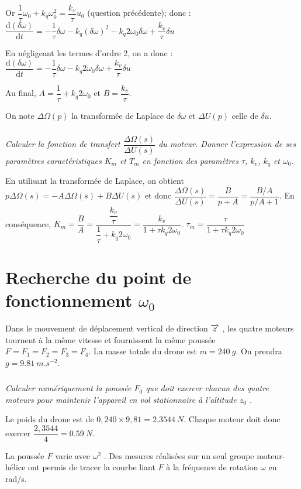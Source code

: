 \begin{multicols}{2}
\begin{corrige}
Or $\dfrac{1}{\tau}\omega_0 +k_q\omega_0^2 = \dfrac{k_v}{\tau}u_0$ (question précédente); donc :
$
\dfrac{\text{d}\left(\delta \omega \right)}{\text{d}t}= -\dfrac{1}{\tau}\delta \omega-k_q\left(\delta\omega\right)^2 -k_q2 \omega_0 \delta\omega + \dfrac{k_v}{\tau} \delta u
$

En négligeant les termes d'ordre 2, on a donc : 
$
\dfrac{\text{d}\left(\delta \omega \right)}{\text{d}t}= -\dfrac{1}{\tau}\delta \omega -k_q2 \omega_0 \delta\omega + \dfrac{k_v}{\tau} \delta u
$

Au final, $A=\dfrac{1}{\tau}+k_q2 \omega_0$ et $B=\dfrac{k_v}{\tau}$.
\end{corrige}
\else
\fi
On note $\Delta \Omega (p)$ la transformée de Laplace de $\delta \omega$ et $\Delta U(p)$ celle de $\delta u$.


\subparagraph{}\textit{Calculer la fonction de transfert $\dfrac{\Delta{\Omega(s)}}{\Delta U(s)}$ du moteur. Donner l'expression de ses paramètres caractéristiques $K_m$ et $T_m$ en fonction des paramètres $\tau$, $k_v$, $k_q$ et $\omega_0$.}
\ifprof
\begin{corrige}
En utilisant la transformée de Laplace, on obtient $p\Delta\Omega(s) = -A\Delta\Omega(s) + B \Delta U(s)$ et donc 
 $\dfrac{\Delta{\Omega(s)}}{\Delta U(s)}= \dfrac{B}{p+A} = \dfrac{B/A}{p/A+1}  $. 
 En conséquence, $K_m = \dfrac{B}{A} = \dfrac{\dfrac{k_v}{\tau}}{\dfrac{1}{\tau}+k_q2 \omega_0}= \dfrac{k_v}{1+\tau k_q2 \omega_0}$. 
 $\tau_m = \dfrac{\tau}{1+\tau k_q2 \omega_0} $ 
\end{corrige}
\else
\fi
\section*{Recherche du point de fonctionnement $\omega_0$}
Dans le mouvement de déplacement vertical de direction $\overrightarrow{z}$ , les quatre moteurs tournent à la même vitesse et fournissent la même poussée $F=F_1=F_2=F_3=F_4$.
La masse totale du drone est $m=\SI{240}{g}$. On prendra $g=\SI{9,81}{m.s^{-2}}$.

\subparagraph{}\textit{Calculer numériquement la poussée $F_0$ que doit exercer chacun des quatre moteurs pour maintenir l’appareil en vol stationnaire à l’altitude $z_0$ .}
\ifprof
\begin{corrige}
Le poids du drone est de $0,240\times 9,81 = \SI{2,3544}{N}$. Chaque moteur doit donc exercer $\dfrac{2,3544}{4}=\SI{0,59}{N}$.
\end{corrige}
\else
\fi
La poussée $F$ varie avec $\omega^2$ . Des mesures réalisées sur un seul groupe moteur-hélice ont permis de tracer la courbe liant $F$ à la fréquence de rotation $\omega$ en rad/s.


\end{multicols}
